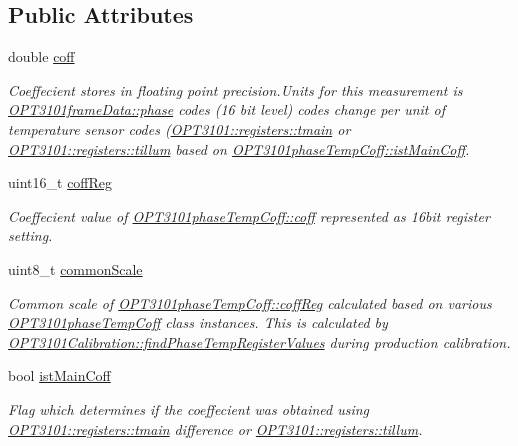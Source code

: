 \subsection*{Public Attributes}
\begin{DoxyCompactItemize}
\item 
double \mbox{\hyperlink{class_o_p_t3101phase_temp_coff_a620b60e04178524cfa6a7bf558f1976c}{coff}}
\begin{DoxyCompactList}\small\item\em Coeffecient stores in floating point precision.\+Units for this measurement is \mbox{\hyperlink{class_o_p_t3101frame_data_a4d07c723715856ea9652b3d672d01191}{O\+P\+T3101frame\+Data\+::phase}} codes (16 bit level) codes change per unit of temperature sensor codes (\mbox{\hyperlink{class_o_p_t3101_1_1registers_a3dfd8d81d4cb04d274007deb7c6122fc}{O\+P\+T3101\+::registers\+::tmain}} or \mbox{\hyperlink{class_o_p_t3101_1_1registers_a8a097a41ecdf2b98226c4a3a92121c12}{O\+P\+T3101\+::registers\+::tillum}} based on \mbox{\hyperlink{class_o_p_t3101phase_temp_coff_a1a23b6ee727c71eb59b07bda0c81476b}{O\+P\+T3101phase\+Temp\+Coff\+::ist\+Main\+Coff}}. \end{DoxyCompactList}\item 
uint16\+\_\+t \mbox{\hyperlink{class_o_p_t3101phase_temp_coff_ad838e80740244ac22e7e63f6f6f18ab6}{coff\+Reg}}
\begin{DoxyCompactList}\small\item\em Coeffecient value of \mbox{\hyperlink{class_o_p_t3101phase_temp_coff_a620b60e04178524cfa6a7bf558f1976c}{O\+P\+T3101phase\+Temp\+Coff\+::coff}} represented as 16bit register setting. \end{DoxyCompactList}\item 
uint8\+\_\+t \mbox{\hyperlink{class_o_p_t3101phase_temp_coff_a2cddefa4a6f418f7c90ba236143a2d1d}{common\+Scale}}
\begin{DoxyCompactList}\small\item\em Common scale of \mbox{\hyperlink{class_o_p_t3101phase_temp_coff_ad838e80740244ac22e7e63f6f6f18ab6}{O\+P\+T3101phase\+Temp\+Coff\+::coff\+Reg}} calculated based on various \mbox{\hyperlink{class_o_p_t3101phase_temp_coff}{O\+P\+T3101phase\+Temp\+Coff}} class instances. This is calculated by \mbox{\hyperlink{class_o_p_t3101_calibration_aec7a07b81ddeb24225d9d4b15200302c}{O\+P\+T3101\+Calibration\+::find\+Phase\+Temp\+Register\+Values}} during production calibration. \end{DoxyCompactList}\item 
bool \mbox{\hyperlink{class_o_p_t3101phase_temp_coff_a1a23b6ee727c71eb59b07bda0c81476b}{ist\+Main\+Coff}}
\begin{DoxyCompactList}\small\item\em Flag which determines if the coeffecient was obtained using \mbox{\hyperlink{class_o_p_t3101_1_1registers_a3dfd8d81d4cb04d274007deb7c6122fc}{O\+P\+T3101\+::registers\+::tmain}} difference or \mbox{\hyperlink{class_o_p_t3101_1_1registers_a8a097a41ecdf2b98226c4a3a92121c12}{O\+P\+T3101\+::registers\+::tillum}}. \end{DoxyCompactList}\end{DoxyCompactItemize}


